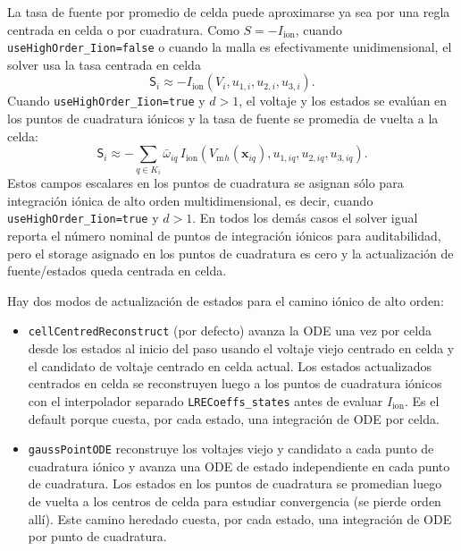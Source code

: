 \documentclass[11pt,a4paper]{article}
\newcommand{\code}[1]{\texttt{\small #1}}
\newcommand{\Vm}{V_{\text{m}}}
\newcommand{\Iion}{I_{\mathrm{ion}}}
\begin{document}
La tasa de fuente por promedio de celda puede aproximarse ya sea por una regla centrada en
celda o por cuadratura. Como $S=-\Iion$, cuando \code{useHighOrder\_Iion=false} o cuando la
malla es efectivamente unidimensional, el solver usa la tasa centrada en celda
\begin{equation}
  \mathsf{S}_i
  \approx
  -\Iion(V_i,u_{1,i},u_{2,i},u_{3,i}).
\end{equation}
Cuando \code{useHighOrder\_Iion=true} y $d>1$, el voltaje y los estados se evalúan en los
puntos de cuadratura iónicos y la tasa de fuente se promedia de vuelta a la celda:
\begin{equation}
  \mathsf{S}_i
  \approx
  -\sum_{q\in K_i}\bar{\omega}_{iq}\,
  \Iion
  \left(
    \Vm{}_{h}(\mathbf{x}_{iq}),
    u_{1,iq},
    u_{2,iq},
    u_{3,iq}
  \right).
  \label{eq:iion-quadrature}
\end{equation}
Estos campos escalares en los puntos de cuadratura se asignan sólo para integración iónica
de alto orden multidimensional, es decir, cuando \code{useHighOrder\_Iion=true} y $d>1$. En
todos los demás casos el solver igual reporta el número nominal de puntos de integración
iónicos para auditabilidad, pero el storage asignado en los puntos de cuadratura es cero y
la actualización de fuente/estados queda centrada en celda.

Hay dos modos de actualización de estados para el camino iónico de alto orden:
\begin{itemize}
\item \code{cellCentredReconstruct} (por defecto) avanza la ODE una vez por celda desde los
estados al inicio del paso usando el voltaje viejo centrado en celda y el candidato de
voltaje centrado en celda actual. Los estados actualizados centrados en celda se reconstruyen
luego a los puntos de cuadratura iónicos con el interpolador separado
\code{LRECoeffs\_states} antes de evaluar $\Iion$. Es el default porque cuesta, por cada estado, una
integración de ODE por celda.
\item \code{gaussPointODE} reconstruye los voltajes viejo y candidato a cada punto de
cuadratura iónico y avanza una ODE de estado independiente en cada punto de cuadratura. Los
estados en los puntos de cuadratura se promedian luego de vuelta a los centros de celda para estudiar convergencia (se pierde orden allí).
Este camino heredado cuesta, por cada estado, una integración de ODE por punto de cuadratura.
\end{itemize}

\end{document}

